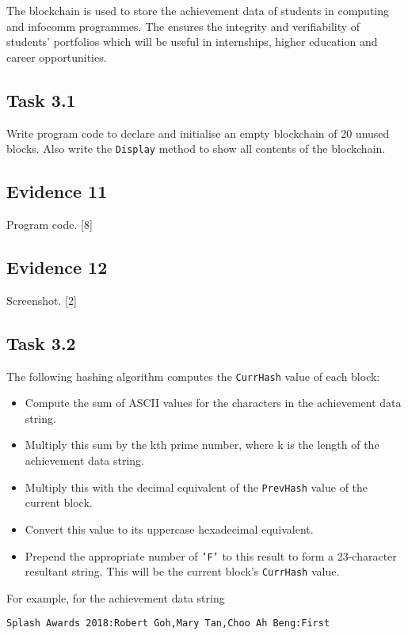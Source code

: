 The blockchain is used to store the achievement data of students in
computing and infocomm programmes. The ensures the integrity and verifiability
of students' portfolios which will be useful in internships, higher
education and career opportunities.

\subsection*{Task 3.1}

Write program code to declare and initialise an empty blockchain of
20 unused blocks. Also write the \texttt{Display} method to show all
contents of the blockchain.

\subsection*{Evidence 11}

Program code. \hfill{}{[}8{]}

\subsection*{Evidence 12 }

Screenshot. \hfill{}{[}2{]}

\subsection*{Task 3.2 }

The following hashing algorithm computes the \texttt{CurrHash} value
of each block: 
\begin{itemize}
\item Compute the sum of ASCII values for the characters in the achievement
data string. 
\item Multiply this sum by the kth prime number, where k is the length of
the achievement data string. 
\item Multiply this with the decimal equivalent of the \texttt{PrevHash}
value of the current block. 
\item Convert this value to its uppercase hexadecimal equivalent. 
\item Prepend the appropriate number of \texttt{'F'} to this result to form
a 23-character resultant string. This will be the current block's
\texttt{CurrHash} value.
\end{itemize}
For example, for the achievement data string
\noindent \begin{center}
\texttt{Splash Awards 2018:Robert Goh,Mary Tan,Choo Ah Beng:First }
\par\end{center}

